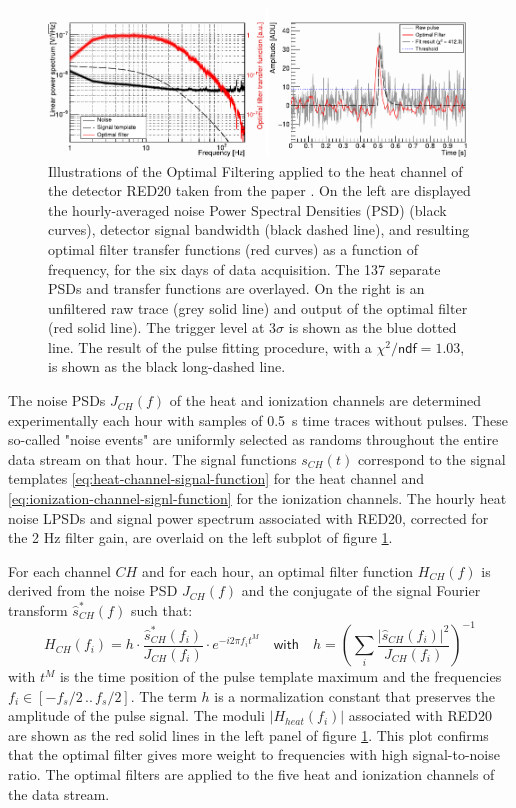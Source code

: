 \begin{figure}
\centering
\includegraphics[scale=1]{Figures/ElectrodesExperimental/of_illustration.pdf}
\caption{Illustrations of the Optimal Filtering applied to the heat channel of the detector RED20 taken from the paper \cite{Armengaud:2019kfj}. On the left are displayed the hourly-averaged noise Power Spectral Densities (PSD) (black curves), detector signal bandwidth (black dashed line), and resulting optimal filter transfer functions (red
curves) as a function of frequency, for the six days of data acquisition. The 137 separate PSDs
and transfer functions are overlayed. On the right is an unfiltered raw trace
(grey solid line) and output of the optimal filter (red solid line). The trigger level at $3\sigma$ is shown
as the blue dotted line. The result of the pulse fitting procedure, with a $\chi^2/\textsf{ndf} = 1.03$, is shown as the black long-dashed line.}
\label{fig:optimal-filtering}
\end{figure}

The noise PSDs $J_{CH}(f)$ of the heat and ionization channels are determined experimentally each hour with samples of \SI{0.5}{\s} time traces without pulses. These so-called "noise events" are uniformly selected as randoms throughout the entire data stream on that hour. The signal functions $s_{CH}(t)$ correspond to the signal templates \ref{eq:heat-channel-signal-function} for the heat channel and \ref{eq:ionization-channel-signl-function} for the ionization channels. The hourly heat noise LPSDs and signal power spectrum associated with RED20, corrected for the 2 Hz filter gain, are overlaid on the left subplot of figure \ref{fig:optimal-filtering}.

For each channel $CH$ and for each hour, an optimal filter function $H_{CH}(f)$ is derived from the noise PSD $J_{CH}(f)$ and the conjugate of the signal Fourier transform $\hat{s}^*_{CH}(f)$ such that:
\begin{equation}
\label{eq:optimal-filter}
H_{CH}(f_i) = 
h \cdot \frac{\hat{s}_{CH}^*(f_i)}{J_{CH}(f_i)}
\cdot e^{-i 2 \pi f_i t^M}
\quad \textsf{with} \quad
h =
\left( \sum_i
\frac{|\hat{s}_{CH}(f_i)|^2}{J_{CH}(f_i)}
 \right)^{-1}
\end{equation}
with $t^M$ is the time position of the pulse template maximum and the frequencies $f_i \in [-f_s/2\, .. \,f_s/2]$. The term $h$ is a normalization constant that preserves the amplitude of the pulse signal. The moduli $|H_{heat}(f_i)|$ associated with RED20 are shown as the red solid lines in the left panel of figure \ref{fig:optimal-filtering}. This plot confirms that the optimal filter gives more weight to frequencies with high signal-to-noise ratio. The optimal filters are applied to the five heat and ionization channels of the data stream.

